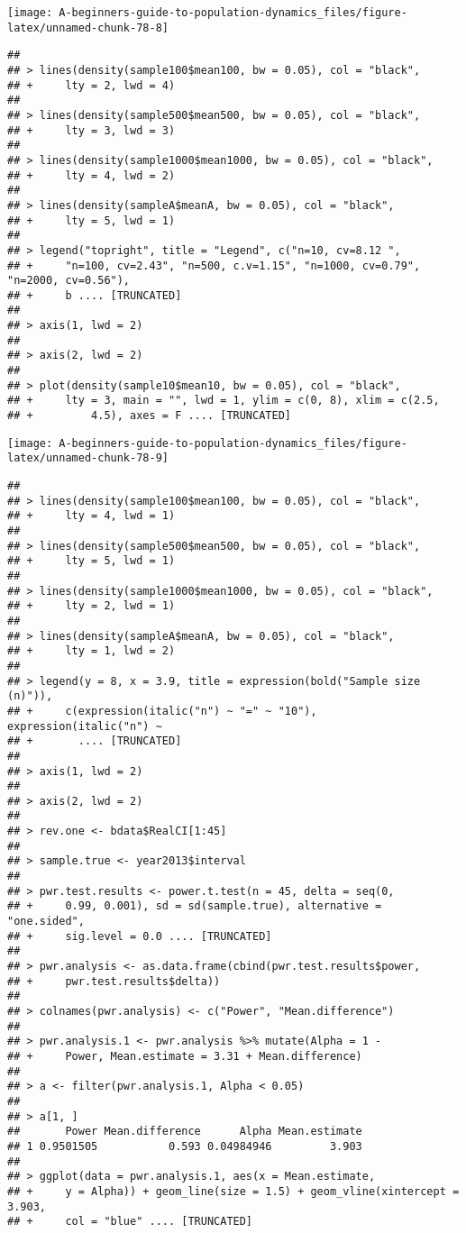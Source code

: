 \documentclass[]{book}
\begin{document}
\begin{center}\texttt{[image: A-beginners-guide-to-population-dynamics\_files/figure-latex/unnamed-chunk-78-8]} \end{center}

\begin{verbatim}
## 
## > lines(density(sample100$mean100, bw = 0.05), col = "black", 
## +     lty = 2, lwd = 4)
## 
## > lines(density(sample500$mean500, bw = 0.05), col = "black", 
## +     lty = 3, lwd = 3)
## 
## > lines(density(sample1000$mean1000, bw = 0.05), col = "black", 
## +     lty = 4, lwd = 2)
## 
## > lines(density(sampleA$meanA, bw = 0.05), col = "black", 
## +     lty = 5, lwd = 1)
## 
## > legend("topright", title = "Legend", c("n=10, cv=8.12 ", 
## +     "n=100, cv=2.43", "n=500, c.v=1.15", "n=1000, cv=0.79", "n=2000, cv=0.56"), 
## +     b .... [TRUNCATED] 
## 
## > axis(1, lwd = 2)
## 
## > axis(2, lwd = 2)
## 
## > plot(density(sample10$mean10, bw = 0.05), col = "black", 
## +     lty = 3, main = "", lwd = 1, ylim = c(0, 8), xlim = c(2.5, 
## +         4.5), axes = F .... [TRUNCATED]
\end{verbatim}

\begin{center}\texttt{[image: A-beginners-guide-to-population-dynamics\_files/figure-latex/unnamed-chunk-78-9]} \end{center}

\begin{verbatim}
## 
## > lines(density(sample100$mean100, bw = 0.05), col = "black", 
## +     lty = 4, lwd = 1)
## 
## > lines(density(sample500$mean500, bw = 0.05), col = "black", 
## +     lty = 5, lwd = 1)
## 
## > lines(density(sample1000$mean1000, bw = 0.05), col = "black", 
## +     lty = 2, lwd = 1)
## 
## > lines(density(sampleA$meanA, bw = 0.05), col = "black", 
## +     lty = 1, lwd = 2)
## 
## > legend(y = 8, x = 3.9, title = expression(bold("Sample size (n)")), 
## +     c(expression(italic("n") ~ "=" ~ "10"), expression(italic("n") ~ 
## +       .... [TRUNCATED] 
## 
## > axis(1, lwd = 2)
## 
## > axis(2, lwd = 2)
## 
## > rev.one <- bdata$RealCI[1:45]
## 
## > sample.true <- year2013$interval
## 
## > pwr.test.results <- power.t.test(n = 45, delta = seq(0, 
## +     0.99, 0.001), sd = sd(sample.true), alternative = "one.sided", 
## +     sig.level = 0.0 .... [TRUNCATED] 
## 
## > pwr.analysis <- as.data.frame(cbind(pwr.test.results$power, 
## +     pwr.test.results$delta))
## 
## > colnames(pwr.analysis) <- c("Power", "Mean.difference")
## 
## > pwr.analysis.1 <- pwr.analysis %>% mutate(Alpha = 1 - 
## +     Power, Mean.estimate = 3.31 + Mean.difference)
## 
## > a <- filter(pwr.analysis.1, Alpha < 0.05)
## 
## > a[1, ]
##       Power Mean.difference      Alpha Mean.estimate
## 1 0.9501505           0.593 0.04984946         3.903
## 
## > ggplot(data = pwr.analysis.1, aes(x = Mean.estimate, 
## +     y = Alpha)) + geom_line(size = 1.5) + geom_vline(xintercept = 3.903, 
## +     col = "blue" .... [TRUNCATED]
\end{verbatim}
\end{document}
